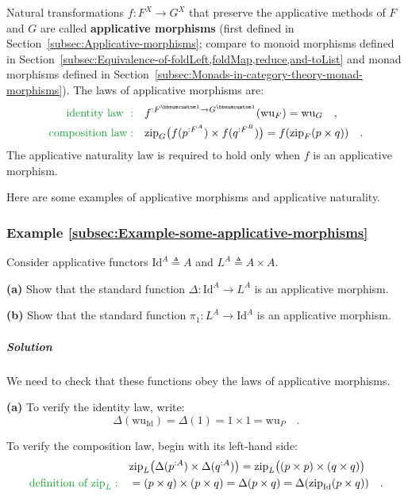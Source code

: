 Natural transformations $f:F^{X}\rightarrow G^{X}$ that preserve
the applicative methods of $F$ and $G$ are called \textbf{applicative
morphisms} (first defined in Section~\ref{subsec:Applicative-morphisms};
compare to monoid morphisms defined in Section~\ref{subsec:Equivalence-of-foldLeft,foldMap,reduce,and-toList}
and monad morphisms defined in Section~\ref{subsec:Monads-in-category-theory-monad-morphisms}).
The laws of applicative morphisms are:
\begin{align}
{\color{greenunder}\text{identity law }:}\quad & f^{:F^{\bbnum 1}\rightarrow G^{\bbnum 1}}(\text{wu}_{F})=\text{wu}_{G}\quad,\label{eq:identity-law-of-applicative-morphism}\\
{\color{greenunder}\text{composition law}:}\quad & \text{zip}_{G}\big(f(p^{:F^{A}})\times f(q^{:F^{B}})\big)=f(\text{zip}_{F}(p\times q))\quad.\label{eq:composition-law-of-applicative-morphism}
\end{align}
The applicative naturality law is required to hold only when $f$
is an applicative morphism.

Here are some examples of applicative morphisms and applicative naturality.

\subsubsection{Example \label{subsec:Example-some-applicative-morphisms}\ref{subsec:Example-some-applicative-morphisms}}

Consider applicative functors $\text{Id}^{A}\triangleq A$ and $L^{A}\triangleq A\times A$. 

\textbf{(a)} Show that the standard function $\Delta:\text{Id}^{A}\rightarrow L^{A}$
is an applicative morphism.

\textbf{(b)} Show that the standard function $\pi_{1}:L^{A}\rightarrow\text{Id}^{A}$
is an applicative morphism. 

\subparagraph{Solution}

We need to check that these functions obey the laws of applicative
morphisms.

\textbf{(a)} To verify the identity law, write:
\[
\Delta(\text{wu}_{\text{Id}})=\Delta(1)=1\times1=\text{wu}_{P}\quad.
\]

To verify the composition law, begin with its left-hand side:
\begin{align*}
 & \text{zip}_{L}\big(\Delta(p^{:A})\times\Delta(q^{:A})\big)=\text{zip}_{L}\big((p\times p)\times(q\times q)\big)\\
{\color{greenunder}\text{definition of }\text{zip}_{L}:}\quad & =(p\times q)\times(p\times q)=\Delta(p\times q)=\Delta(\text{zip}_{\text{Id}}(p\times q))\quad.
\end{align*}

